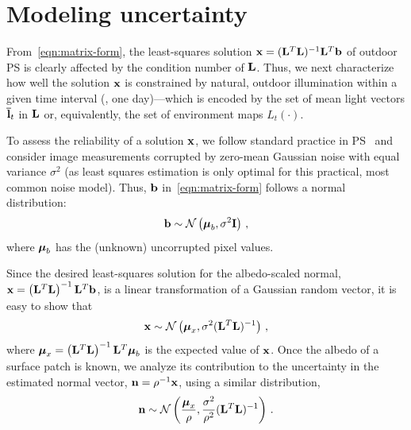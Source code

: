 \section{Modeling uncertainty}

From~\eqref{eqn:matrix-form}, the least-squares solution ${\bf x} = ({\bf L}^T{\bf L})^{-1}{\bf L}^T{\bf b}$ of outdoor PS is clearly affected by the condition number of ${\bf L}$. Thus, we next characterize how well the solution ${\bf x}$ is constrained by natural, outdoor illumination within a given time interval (\eg, one day)---which is encoded by the set of mean light vectors ${\bf \bar l}_t$ in ${\bf L}$ or, equivalently, the set of environment maps $L_t(\cdot)$.

To assess the reliability of a solution ${\bf x}$, we follow standard practice in PS~\cite{klaudiny-prl-14,sun-ivc-07} and consider image measurements corrupted by zero-mean Gaussian noise with equal variance $\sigma^2$ (as least squares estimation is only optimal for this practical, most common noise model). Thus, ${\bf b}$ in~\eqref{eqn:matrix-form} follows a normal distribution:
%
\begin{equation}
{\bf b} \sim \mathcal{N}\left( \boldsymbol \mu_b, \sigma^2 {\bf I} \right)\,,
\end{equation}
%
where $\boldsymbol \mu_b$ has the (unknown) uncorrupted pixel values.

Since the desired least-squares solution for the albedo-scaled normal, ${\bf x} = \left({\bf L}^T{\bf L}\right)^{-1}{\bf L}^T{\bf b}$, is a linear transformation of a Gaussian random vector, it is easy to show that
%
\begin{equation}
{\bf x} \sim \mathcal{N} \left( \boldsymbol \mu_x, \sigma^2({\bf L}^T{\bf L})^{-1} \right)\,,
\end{equation}
where $\boldsymbol \mu_x = \left({\bf L}^T{\bf L}\right)^{-1}{\bf L}^T\boldsymbol \mu_b$ is the expected value of ${\bf x}$.
Once the albedo of a surface patch is known, we analyze its contribution to the uncertainty in the estimated normal vector, ${\bf n} = \rho^{-1}{\bf x}$, using a similar distribution,
%
\begin{equation}
{\bf n} \sim \mathcal{N} \left( \frac{\boldsymbol \mu_x}{\rho}, \frac{\sigma^2}{\rho^2}({\bf L}^T{\bf L})^{-1} \right)\,.
\label{eqn:normal-distrib}
\end{equation}

